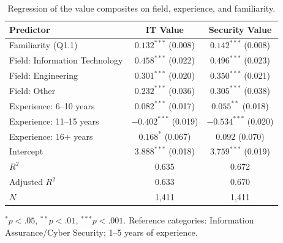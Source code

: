 \begin{table}[ht]
\centering
\caption{Regression of the value composites on field, experience, and familiarity.}
\label{tab:regression}
\small
\begin{tabular}{lcc}
\toprule
Predictor & IT Value & Security Value \\
\midrule
Familiarity (Q1.1) & $0.132^{***}$ (0.008) & $0.142^{***}$ (0.008) \\
Field: Information Technology & $0.458^{***}$ (0.022) & $0.496^{***}$ (0.023) \\
Field: Engineering & $0.301^{***}$ (0.020) & $0.350^{***}$ (0.021) \\
Field: Other & $0.232^{***}$ (0.036) & $0.305^{***}$ (0.038) \\
Experience: 6--10 years & $0.082^{***}$ (0.017) & $0.055^{**}$ (0.018) \\
Experience: 11--15 years & $-0.402^{***}$ (0.019) & $-0.534^{***}$ (0.020) \\
Experience: 16+ years & $0.168^{*}$ (0.067) & $0.092$ (0.070) \\
Intercept & $3.888^{***}$ (0.018) & $3.759^{***}$ (0.019) \\
\midrule
$R^2$ & 0.635 & 0.672 \\
Adjusted $R^2$ & 0.633 & 0.670 \\
$N$ & 1{,}411 & 1{,}411 \\
\bottomrule
\end{tabular}

\smallskip
\footnotesize $^{*}p<.05$, \;$^{**}p<.01$, \;$^{***}p<.001$. Reference categories: Information Assurance/Cyber Security; 1--5 years of experience.
\end{table}
